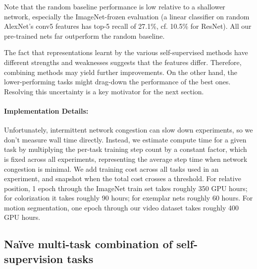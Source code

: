 \documentclass[10pt,twocolumn,letterpaper]{article}
\begin{document}
Note that the random baseline performance is low relative to a shallower network, 
especially the ImageNet-frozen evaluation
(a linear classifier on random AlexNet's conv5 features has top-5
recall of 27.1\%, cf. 10.5\% for ResNet).  
All our pre-trained nets far outperform the random baseline.

The fact that representations learnt by the various self-supervised methods have different
strengths and weaknesses suggests that the features differ.
Therefore, combining methods may yield further improvements.
On the other hand, the lower-performing tasks might drag-down the performance 
of the best ones.  
Resolving this uncertainty is a key motivator for the next section.



\paragraph{Implementation Details:} Unfortunately, intermittent network congestion can slow down
experiments, so we don't measure wall time directly.  Instead, we
estimate compute time for a given task by multiplying the per-task
training step count by a constant factor, which is fixed across all
experiments, representing the average step time when network
congestion is minimal.  We add training cost across all tasks used in an experiment, and
snapshot when the total cost crosses a threshold.  
For relative position, 1 epoch through the ImageNet train set takes roughly 350 GPU hours; for colorization it takes roughly 90 hours; for exemplar nets roughly 60 hours.
For motion segmentation, one epoch through our video dataset takes roughly 400 GPU hours.




\subsection{Na{\"i}ve multi-task combination of self-supervision tasks}
\label{sec:naive}
\end{document}
